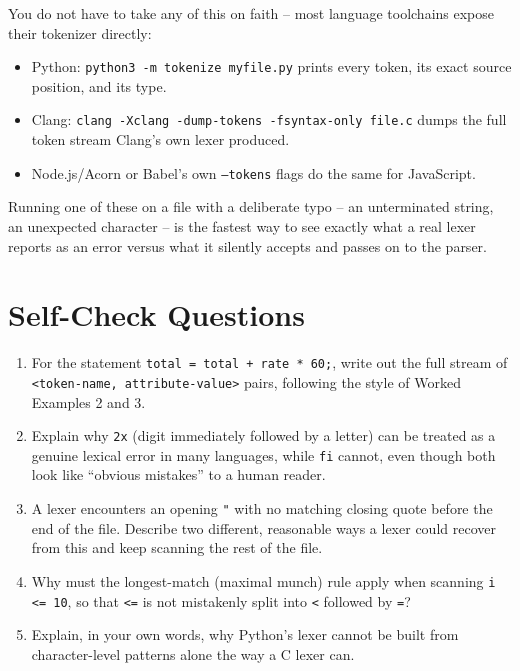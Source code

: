 \documentclass[11pt]{article}
\begin{document}
\begin{enrichment}
You do not have to take any of this on faith -- most language toolchains expose their tokenizer
directly:
\begin{itemize}
  \item Python: \texttt{python3 -m tokenize myfile.py} prints every token, its exact source
  position, and its type.
  \item Clang: \texttt{clang -Xclang -dump-tokens -fsyntax-only file.c} dumps the full token
  stream Clang's own lexer produced.
  \item Node.js/Acorn or Babel's own \texttt{--tokens} flags do the same for JavaScript.
\end{itemize}
Running one of these on a file with a deliberate typo -- an unterminated string, an unexpected
character -- is the fastest way to see exactly what a real lexer reports as an error versus what
it silently accepts and passes on to the parser.
\end{enrichment}

\section{Self-Check Questions}

\begin{enrichment}
\begin{enumerate}
  \item For the statement \texttt{total = total + rate * 60;}, write out the full stream of
  \texttt{<token-name, attribute-value>} pairs, following the style of Worked Examples 2 and 3.
  \item Explain why \texttt{2x} (digit immediately followed by a letter) can be treated as a
  genuine lexical error in many languages, while \texttt{fi} cannot, even though both look like
  ``obvious mistakes'' to a human reader.
  \item A lexer encounters an opening \texttt{"} with no matching closing quote before the end
  of the file. Describe two different, reasonable ways a lexer could recover from this and keep
  scanning the rest of the file.
  \item Why must the longest-match (maximal munch) rule apply when scanning \texttt{i <= 10}, so
  that \texttt{<=} is not mistakenly split into \texttt{<} followed by \texttt{=}?
  \item Explain, in your own words, why Python's lexer cannot be built from character-level
  patterns alone the way a C lexer can.
\end{enumerate}
\end{enrichment}
\end{document}
